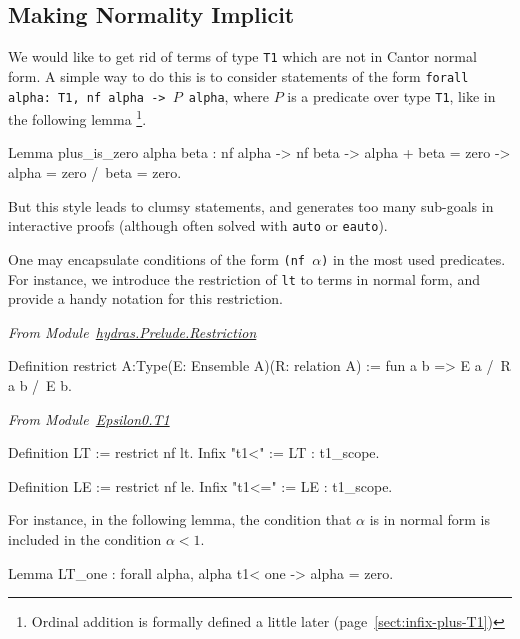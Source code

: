 \subsection{Making Normality Implicit}
  We would like to get rid of terms of type \texttt{T1} which are not in Cantor normal form.
A simple way to do this is to consider statements of the form 
\texttt{forall alpha: T1, nf alpha -> $P$ alpha}, where $P$ is a predicate over type \texttt{T1}, like in the following lemma \footnote{Ordinal addition is formally defined a little later (page~\ref{sect:infix-plus-T1})}.

\begin{Coqsrc}
Lemma plus_is_zero alpha beta :
  nf alpha -> nf beta ->
  alpha + beta  = zero -> alpha = zero /\  beta = zero.
\end{Coqsrc}

But this style leads to clumsy statements, and generates too many sub-goals in interactive proofs (although often solved with \texttt{auto} or \texttt{eauto}).

One may encapsulate conditions of the form \texttt{(nf $\alpha$)} in
the most used predicates. For instance, we introduce the restriction of \texttt{lt} to terms in normal form, and provide a handy notation for this restriction.

\vspace{4pt}
\emph{From Module~\href{../theories/html/hydras.Prelude.Restriction.html}{hydras.Prelude.Restriction}}

\begin{Coqsrc}
Definition restrict {A:Type}(E: Ensemble A)(R: relation A) :=
    fun a b => E a /\ R a b /\ E b.
 \end{Coqsrc}

 
\vspace{4pt}
\emph{From Module~\href{../theories/html/hydras.Epsilon0.T1.html\#LT}{Epsilon0.T1}}

\begin{Coqsrc}
Definition LT := restrict nf lt.
Infix "t1<" := LT : t1_scope.

Definition LE := restrict nf le.
Infix "t1<=" := LE : t1_scope.
\end{Coqsrc}


\label{Predicates:LT-T1}
 

For instance, in the following lemma, the condition that $\alpha$ is in normal form is included in the condition $\alpha< 1$.

\begin{Coqsrc}
Lemma LT_one : forall alpha, alpha t1< one -> alpha = zero.
\end{Coqsrc}

